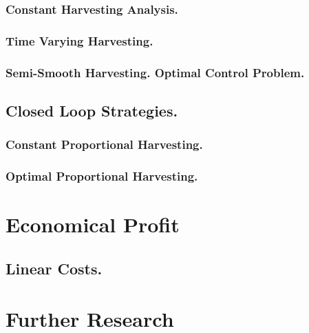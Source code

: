 \documentclass[twoside,colorback,accentcolor=tud4c,11pt]{tudreport}
\begin{document}
		\subsection{Constant Harvesting Analysis.}
		
		\subsection{Time Varying Harvesting.}
		
		\subsection{Semi-Smooth Harvesting. Optimal Control Problem.}
		
	\section{Closed Loop Strategies.}
	\label{sec: ClosedLoop}
		\graphicspath{{FishingStrategies/ClosedLoop/}}
		
		\subsection{Constant Proportional Harvesting.}
		\graphicspath{{FishingStrategies/ClosedLoop/ConstantProportional/}}
		
		\subsection{Optimal Proportional Harvesting.}
		
\chapter{Economical Profit}\label{chap: Economical Profit}
	
	\section{Linear Costs.}
	
%	
%	
\chapter{Further Research}\label{chap: Further Enhancements}



{}

\nocite{*}
\end{document}
